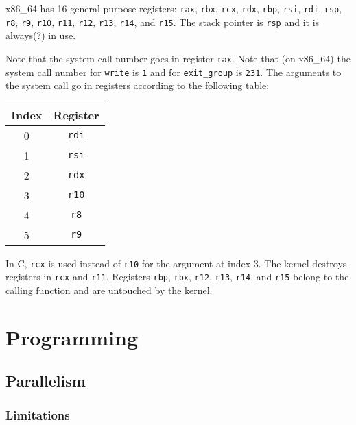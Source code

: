 \documentclass[12pt]{book}
\begin{document}
  x86\_64 has 16 general purpose registers: \texttt{rax},
  \texttt{rbx}, \texttt{rcx}, \texttt{rdx},
  \texttt{rbp}, \texttt{rsi}, \texttt{rdi},
  \texttt{rsp}, \texttt{r8}, \texttt{r9},
  \texttt{r10}, \texttt{r11}, \texttt{r12},
  \texttt{r13}, \texttt{r14}, and \texttt{r15}. The
  stack pointer is \texttt{rsp} and it is always(?) in use.

  Note that the system call number goes in register \texttt{rax}. Note
  that (on x86\_64) the system call number for \texttt{write} is
  \texttt{1} and for \texttt{exit_group} is \texttt{231}. The arguments
  to the system call go in registers according to the following table:

  {\ttfamily\begin{tabular}{c c}
    \hline
    Index & Register \\
    \hline
    0 & \texttt{rdi} \\
    1 & \texttt{rsi} \\
    2 & \texttt{rdx} \\
    3 & \texttt{r10} \\
    4 & \texttt{r8} \\
    5 & \texttt{r9} \\
  \end{tabular}}

  In C, \texttt{rcx} is used instead of \texttt{r10} for
  the argument at index 3. The kernel destroys registers in
  \texttt{rcx} and \texttt{r11}. Registers
  \texttt{rbp}, \texttt{rbx}, \texttt{r12},
  \texttt{r13}, \texttt{r14}, and \texttt{r15} belong
  to the calling function and are untouched by the kernel.

  \chapter{Programming}

  \section{Parallelism}

  \subsection{Limitations}
\end{document}
